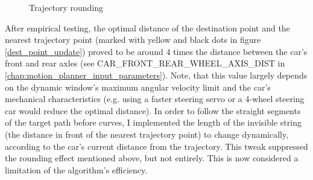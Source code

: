 \begin{figure}[!ht]
    \centering
    \caption{Trajectory rounding}
    \label{traj_rounding}
\end{figure}

After empirical testing, the optimal distance of the destination point and the nearest trajectory point (marked with yellow and black dots in figure \ref{dest_point_update}) proved to be around 4 times the distance between the car's front and rear axles (see CAR\_FRONT\_REAR\_WHEEL\_AXIS\_DIST in \ref{chap:motion_planner_input_parameters}). Note, that this value largely depends on the dynamic window's maximum angular velocity limit and the car's mechanical characteristics (e.g. using a faster steering servo or a 4-wheel steering car would reduce the optimal distance).
In order to follow the straight segments of the target path before curves, I implemented the length of the invisible string (the distance in front of the nearest trajectory point) to change dynamically, according to the car's current distance from the trajectory. This tweak suppressed the rounding effect mentioned above, but not entirely. This is now considered a limitation of the algorithm's efficiency.

